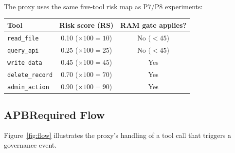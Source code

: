 \documentclass[11pt]{article}
\begin{document}
The proxy uses the same five-tool risk map as P7/P8 experiments:

\begin{center}
\small
\begin{tabular}{lcc}
\toprule
Tool & Risk score (RS) & RAM gate applies? \\
\midrule
\texttt{read\_file}     & 0.10 ($\times 100 = 10$)  & No ($<45$) \\
\texttt{query\_api}     & 0.25 ($\times 100 = 25$)  & No ($<45$) \\
\texttt{write\_data}    & 0.45 ($\times 100 = 45$)  & Yes \\
\texttt{delete\_record} & 0.70 ($\times 100 = 70$)  & Yes \\
\texttt{admin\_action}  & 0.90 ($\times 100 = 90$)  & Yes \\
\bottomrule
\end{tabular}
\end{center}

\subsection{APBRequired Flow}

Figure~\ref{fig:flow} illustrates the proxy's handling of a
tool call that triggers a governance event.
\end{document}
